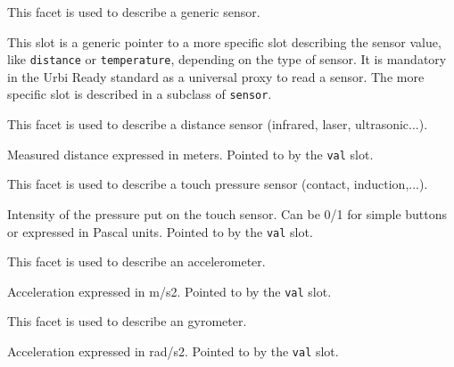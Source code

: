 
This facet is used to describe a generic sensor.

\begin{slots}
  {%
    This slot is a generic pointer to a more specific slot describing
    the sensor value, like \texttt{distance} or \texttt{temperature},
    depending on the type of sensor. It is mandatory in the Urbi Ready
    standard as a universal proxy to read a sensor. The more specific
    slot is described in a subclass of \texttt{sensor}.%
  }

\end{slots}



This facet is used to describe a distance sensor (infrared, laser,
ultrasonic...).

\begin{slots}
  {%
    Measured distance expressed in meters.  Pointed to by the
    \texttt{val} slot.%
  }

\end{slots}



This facet is used to describe a touch pressure sensor (contact,
induction,...).

\begin{slots}
  {%
    Intensity of the pressure put on the touch sensor. Can be 0/1 for
    simple buttons or expressed in Pascal units. Pointed to by the
    \texttt{val} slot.%
  }

\end{slots}



This facet is used to describe an accelerometer.

\begin{slots}
  {%
    Acceleration expressed in m/s2.  Pointed to by the \texttt{val}
    slot.%
  }

\end{slots}

This facet is used to describe an gyrometer.

\begin{slots}
  {%
    Acceleration expressed in rad/s2.  Pointed to by the \texttt{val}
    slot.%
  }
\end{slots}

